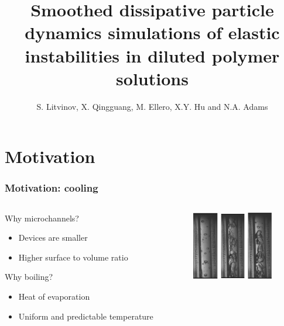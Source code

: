 \documentclass{beamer}
\title[elastic instabilities]{Smoothed dissipative particle dynamics simulations of elastic instabilities in diluted polymer solutions}
\date{}
\author{S. Litvinov, X. Qingguang, M. Ellero, X.Y. Hu and N.A. Adams}
\institute{
  Lehrstuhl f\"{u}r Aerodynamik und Str\"{o}mungsmechanik \\
  TU M\"{u}nchen
}
\begin{document}
\begin{frame}
  \titlepage
\end{frame}

\begin{frame}
  \tableofcontents
\end{frame}

\section[Motivation]{Motivation}
\begin{frame}
  \frametitle{Motivation: cooling}
  \begin{columns}
    \begin{column}{0.5\textwidth}
      \begin{block}{Why microchannels?}
        \begin{itemize}
        \item Devices are smaller
        \item Higher surface to volume ratio
        \end{itemize}
      \end{block}
      \begin{block}{Why boiling?}
        \begin{itemize}
        \item Heat of evaporation
        \item Uniform and predictable temperature
        \end{itemize}
      \end{block}
    \end{column}
    \begin{column}{0.5\textwidth}
      \begin{figure}
        \centering
        \includegraphics[width=1.1cm]{exp01.png}
        \includegraphics[width=1.1cm]{exp02.png}
        \includegraphics[width=1.1cm]{exp03.png}

\end{figure}
\end{column}
\end{columns}
\end{frame}
\end{document}
